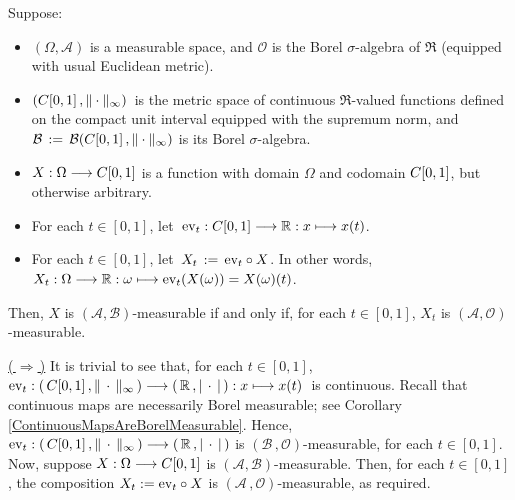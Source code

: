 \vskip 0.8cm
\begin{theorem}
\mbox{}\vskip 0.1cm
\noindent
Suppose:
\begin{itemize}
\item	$\left(\Omega,\mathcal{A}\right)$ is a measurable space, and
		$\mathcal{O}$ is the Borel $\sigma$-algebra of $\Re$ (equipped with usual Euclidean metric).
\item	$(C[0,1]\,,\Vert\cdot\Vert_{\infty})$\, is the metric space
		of continuous $\Re$-valued functions defined on the compact unit interval
		equipped with the supremum norm, and 
		\,$\mathcal{B} \,:=\, \mathcal{B}(C[0,1]\,,\Vert\cdot\Vert_{\infty})$ is its Borel $\sigma$-algebra.
\item	$X : \Omega \longrightarrow C[0,1]$ is a function with domain $\Omega$
		and codomain $C[0,1]$, but otherwise arbitrary.
\item	For each $t \in [0,1]$, let \,$\textnormal{ev}_{t} : C[0,1] \longrightarrow \mathbb{R} : x \longmapsto x(t)$.
\item 	For each $t \in [0,1]$, let \,$X_{t} \,:=\, \textnormal{ev}_{t} \circ X$.
		In other words, $X_{t} : \Omega \longrightarrow \mathbb{R} : \omega \longmapsto \textnormal{ev}_{t}(X(\omega)) = X(\omega)(t)$.
\end{itemize}
Then, $X$ is $\left(\mathcal{A},\mathcal{B}\right)$-measurable if and only if,
for each $t \in [0,1]$, $X_{t}$ is $\left(\mathcal{A},\mathcal{O}\right)$-measurable.
\end{theorem}
\proof
\vskip 0.3cm
\noindent
\underline{(\,$\Longrightarrow$\,)}\vskip 0.2cm
\noindent
It is trivial to see that, for each $t \in [0,1]$,
\,$\textnormal{ev}_{t} : \left(\,C[0,1]\,,\Vert\,\cdot\,\Vert_{\infty}\,\right) \longrightarrow \left(\,\mathbb{R}\,,\vert\,\cdot\,\vert\,\right) : x \longmapsto x(t)$\, is continuous.
Recall that continuous maps are necessarily Borel measurable; see Corollary \ref{ContinuousMapsAreBorelMeasurable}.
Hence,
$\textnormal{ev}_{t} : \left(\,C[0,1]\,,\Vert\,\cdot\,\Vert_{\infty}\,\right) \longrightarrow \left(\,\mathbb{R}\,,\vert\,\cdot\,\vert\,\right)$
is $(\mathcal{B}\,,\mathcal{O})$-measurable, for each $t \in [0,1]$.
Now, suppose $X : \Omega \longrightarrow C[0,1]$ is $(\mathcal{A},\mathcal{B})$-measurable.
Then, for each $t \in [0,1]$, the composition
$X_{t} := \textnormal{ev}_{t} \circ X$ is $(\mathcal{A}\,,\mathcal{O})$-measurable, as required.

